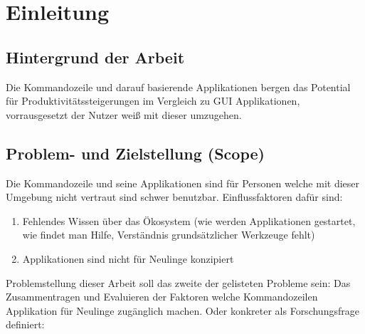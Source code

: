 \documentclass[oneside,bibliography=totocnumbered,BCOR=5mm]{scrbook}
\begin{document}

\chapter{Einleitung}
\section{Hintergrund der Arbeit}

Die Kommandozeile und darauf basierende Applikationen bergen das Potential für Produktivitätssteigerungen im Vergleich zu GUI Applikationen, vorrausgesetzt der Nutzer weiß mit dieser umzugehen. %


\section{Problem- und Zielstellung (Scope)}

Die Kommandozeile und seine Applikationen sind für Personen welche mit dieser Umgebung nicht vertraut sind schwer benutzbar. %
Einflussfaktoren dafür sind:

\begin{enumerate}
  \item Fehlendes Wissen über das Ökosystem (wie werden Applikationen gestartet, wie findet man Hilfe, Verständnis grundsätzlicher Werkzeuge fehlt)
  \item Applikationen sind nicht für Neulinge konzipiert
\end{enumerate}

Problemstellung dieser Arbeit soll das zweite der gelisteten Probleme sein: Das Zusammentragen und Evaluieren der Faktoren welche Kommandozeilen Applikation für Neulinge zugänglich machen. Oder konkreter als Forschungsfrage definiert:

\bigbreak

\end{document}
